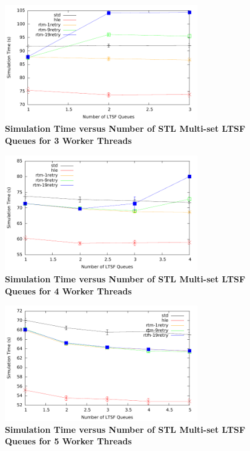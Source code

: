 \documentclass[11pt]{book}
\begin{document}
\begin{figure}[H]
    \centering
    \graphicspath{ {./figures/} }
    \includegraphics[width=0.75\textwidth,keepaspectratio]{hugeepidemicsim-CONTmig-timeVSschedQs-multiset-3thread}
    \caption{\textbf{Simulation Time versus Number of STL Multi-set LTSF Queues for 3
        Worker Threads}}\label{fig:contThrMig_timeVSschq_3threads}
\end{figure}

\begin{figure}[H]
    \centering
    \graphicspath{ {./figures/} }
    \includegraphics[width=0.75\textwidth,keepaspectratio]{hugeepidemicsim-CONTmig-timeVSschedQs-multiset-4thread}
    \caption{\textbf{Simulation Time versus Number of STL Multi-set LTSF Queues for 4
        Worker Threads}}\label{fig:contThrMig_timeVSschq_4threads}
\end{figure}

\begin{figure}[H]
    \centering
    \graphicspath{ {./figures/} }
    \includegraphics[width=0.75\textwidth,keepaspectratio]{hugeepidemicsim-CONTmig-timeVSschedQs-multiset-5thread}
    \caption{\textbf{Simulation Time versus Number of STL Multi-set LTSF Queues for 5
        Worker Threads}}\label{fig:contThrMig_timeVSschq_5threads}
\end{figure}
\end{document}
